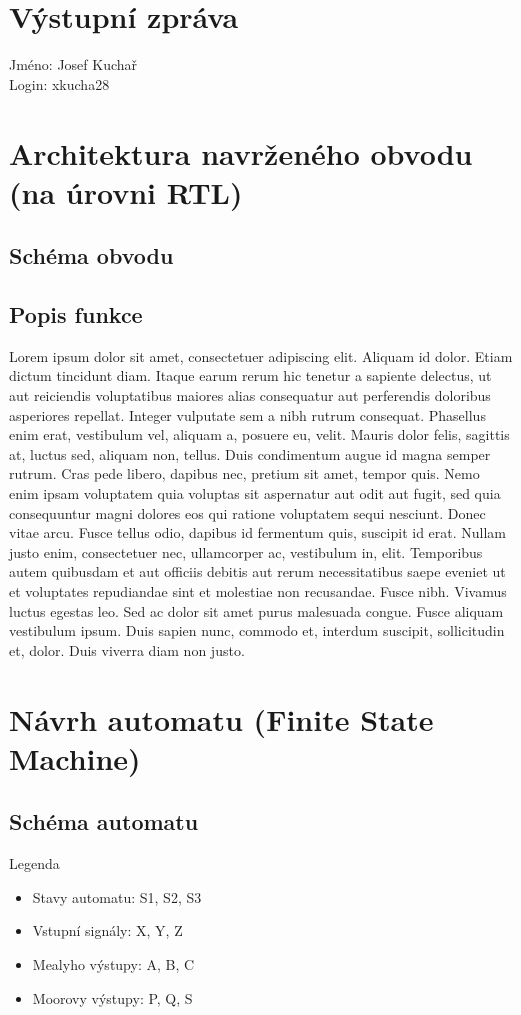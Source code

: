 \documentclass[11pt,a4paper,oneside]{article}
\begin{document}
\section*{\huge{Výstupní zpráva}}
Jméno: Josef Kuchař \\
Login: xkucha28
\section*{Architektura navrženého obvodu (na úrovni RTL)}
\subsection*{Schéma obvodu}
\subsection*{Popis funkce}
Lorem ipsum dolor sit amet, consectetuer adipiscing elit. Aliquam id dolor. Etiam dictum tincidunt diam. Itaque earum rerum hic tenetur a sapiente delectus, ut aut reiciendis voluptatibus maiores alias consequatur aut perferendis doloribus asperiores repellat. Integer vulputate sem a nibh rutrum consequat. Phasellus enim erat, vestibulum vel, aliquam a, posuere eu, velit. Mauris dolor felis, sagittis at, luctus sed, aliquam non, tellus. Duis condimentum augue id magna semper rutrum. Cras pede libero, dapibus nec, pretium sit amet, tempor quis. Nemo enim ipsam voluptatem quia voluptas sit aspernatur aut odit aut fugit, sed quia consequuntur magni dolores eos qui ratione voluptatem sequi nesciunt. Donec vitae arcu. Fusce tellus odio, dapibus id fermentum quis, suscipit id erat. Nullam justo enim, consectetuer nec, ullamcorper ac, vestibulum in, elit. Temporibus autem quibusdam et aut officiis debitis aut rerum necessitatibus saepe eveniet ut et voluptates repudiandae sint et molestiae non recusandae. Fusce nibh. Vivamus luctus egestas leo. Sed ac dolor sit amet purus malesuada congue. Fusce aliquam vestibulum ipsum. Duis sapien nunc, commodo et, interdum suscipit, sollicitudin et, dolor. Duis viverra diam non justo.
\newpage
\section*{Návrh automatu (Finite State Machine)}
\subsection*{Schéma automatu}
Legenda
\begin{itemize}
  \item Stavy automatu: S1, S2, S3
  \item Vstupní signály: X, Y, Z
  \item Mealyho výstupy: A, B, C
  \item Moorovy výstupy: P, Q, S
\end{itemize}
\end{document}
